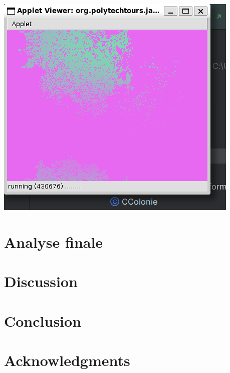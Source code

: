 \documentclass[a4paper,12pt]{article}
\begin{document}
\includegraphics[scale=0.75]{images/appletSansModification.png}

\section{Analyse finale}

\section{Discussion}

\section{Conclusion}

\section*{Acknowledgments}

\begin{thebibliography}{9}
\end{thebibliography}
\end{document}
